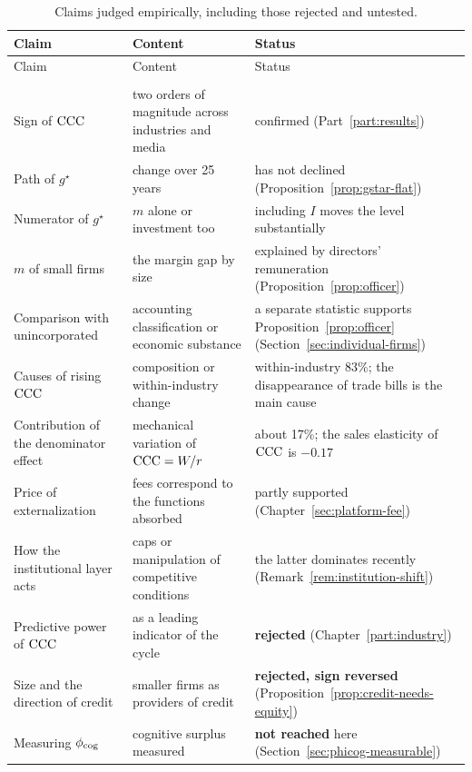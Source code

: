 \begin{longtable}{@{}>{\raggedright\arraybackslash}p{}>{\raggedright\arraybackslash}p{}>{\raggedright\arraybackslash}p{}@{}}
\caption{Claims judged empirically, including those rejected and untested.}\label{tab:empirical-judgments}\\
\toprule
Claim & Content & Status \\
\midrule
\endfirsthead
\toprule
Claim & Content & Status \\
\midrule
\endhead
\midrule
\multicolumn{3}{r}{\footnotesize(continued)}\\
\endfoot
\bottomrule
\endlastfoot
Sign of $\mathrm{CCC}$ & two orders of magnitude across industries and media & confirmed (Part~\ref{part:results}) \\
Path of $g^\star$ & change over 25 years & has not declined (Proposition~\ref{prop:gstar-flat}) \\
Numerator of $g^\star$ & $m$ alone or investment too & including $I$ moves the level substantially \\
$m$ of small firms & the margin gap by size & explained by directors' remuneration (Proposition~\ref{prop:officer}) \\
Comparison with unincorporated & accounting classification or economic substance & a separate statistic supports Proposition~\ref{prop:officer} (Section~\ref{sec:individual-firms}) \\
Causes of rising $\mathrm{CCC}$ & composition or within-industry change & within-industry 83\%; the disappearance of trade bills is the main cause \\
Contribution of the denominator effect & mechanical variation of $\mathrm{CCC}=W/r$ & about 17\%; the sales elasticity of $\mathrm{CCC}$ is $-0.17$ \\
Price of externalization & fees correspond to the functions absorbed & partly supported (Chapter~\ref{sec:platform-fee}) \\
How the institutional layer acts & caps or manipulation of competitive conditions & the latter dominates recently (Remark~\ref{rem:institution-shift}) \\
\midrule
Predictive power of $\mathrm{CCC}$ & as a leading indicator of the cycle & \textbf{rejected} (Chapter~\ref{part:industry}) \\
Size and the direction of credit & smaller firms as providers of credit & \textbf{rejected, sign reversed} (Proposition~\ref{prop:credit-needs-equity}) \\
Measuring $\phi_{\rm cog}$ & cognitive surplus measured & \textbf{not reached} here (Section~\ref{sec:phicog-measurable}) \\

\end{longtable}
